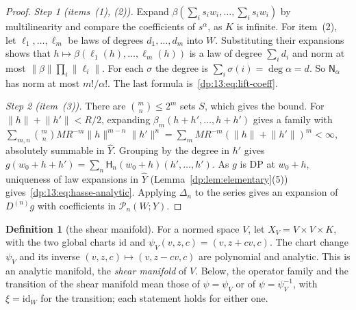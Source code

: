 \documentclass[11pt]{amsart}
\theoremstyle{definition}
\newtheorem{definition}[theorem]{Definition}
\theoremstyle{remark}
\numberwithin{equation}{section}
\newcommand{\id}{\mathrm{id}}
\newcommand{\norm}[1]{\lVert #1\rVert}
\theoremstyle{plain}
\theoremstyle{definition}
\theoremstyle{plain}
\newcommand{\cP}{\mathcal P}
\begin{document}
\begin{proof}
\emph{Step 1 (items~(1), (2)).} Expand $\beta(\sum_is_iw_i,\dots,\sum_is_iw_i)$ by multilinearity and compare the coefficients of $s^\alpha$, as $K$ is infinite. For item~(2), let $\ell_1,\dots,\ell_m$ be laws of degrees $d_1,\dots,d_m$ into $W$. Substituting their expansions shows that $h\mapsto\beta(\ell_1(h),\dots,\ell_m(h))$ is a law of degree $\sum_id_i$ and norm at most $\norm\beta\prod_i\norm{\ell_i}$. For each $\sigma$ the degree is $\sum_i\sigma(i)=\deg\alpha=d$. So $\mathsf N_\alpha$ has norm at most $m!/\alpha!$. The last formula is~\eqref{dp:13:eq:lift-coeff}.

\emph{Step 2 (item~(3)).} There are $\binom mn\le2^m$ sets $S$, which gives the bound. For $\norm h+\norm{h'}<R/2$, expanding $\beta_m(h+h',\dots,h+h')$ gives a family with $\sum_{m,n}\binom mnMR^{-m}\norm h^{m-n}\norm{h'}^n=\sum_mMR^{-m}(\norm h+\norm{h'})^m<\infty$, absolutely summable in $\widehat Y$. Grouping by the degree in $h'$ gives $g(w_0+h+h')=\sum_n\mathsf H_n(w_0+h)(h',\dots,h')$. As $g$ is DP at $w_0+h$, uniqueness of law expansions in $\widehat Y$ (Lemma~\ref{dp:lem:elementary}(5)) gives~\eqref{dp:13:eq:hasse-analytic}. Applying $\Delta_n$ to the series gives an expansion of $D^{(n)}g$ with coefficients in $\cP_n(W;Y)$.
\end{proof}

\begin{definition}[the shear manifold]\label{dp:13:def:shear}
For a normed space $V$, let $X_V=V\times V\times K$, with the two global charts $\id$ and $\psi_V(v,z,c)=(v,z+cv,c)$. The chart change $\psi_V$ and its inverse $(v,z,c)\mapsto(v,z-cv,c)$ are polynomial and analytic. This is an analytic manifold, the \emph{shear manifold} of $V$. Below, the operator family and the transition of the shear manifold mean those of $\psi=\psi_V$ or of $\psi=\psi_V^{-1}$, with $\xi=\id_W$ for the transition; each statement holds for either one.
\end{definition}
\end{document}
